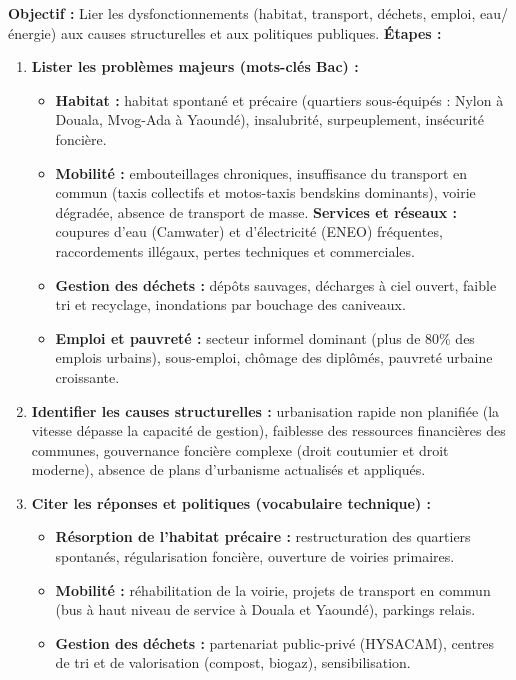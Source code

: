 \documentclass[11pt]{article}
\begin{document}
\begin{methode}
\textbf{Objectif :} Lier les dysfonctionnements (habitat, transport, déchets, emploi, eau/énergie) aux causes structurelles et aux politiques publiques.
\textbf{Étapes :}
\begin{enumerate}
    \item \textbf{Lister les problèmes majeurs (mots-clés Bac) :}
    \begin{itemize}
        \item \textbf{Habitat :} habitat spontané et précaire (quartiers sous-équipés : Nylon à Douala, Mvog-Ada à Yaoundé), insalubrité, surpeuplement, insécurité foncière.
        \item \textbf{Mobilité :} embouteillages chroniques, insuffisance du transport en commun (taxis collectifs et motos-taxis \og bendskins \fg{} dominants), voirie dégradée, absence de transport de masse.
        \textbf{Services et réseaux :} coupures d'eau (Camwater) et d'électricité (ENEO) fréquentes, raccordements illégaux, pertes techniques et commerciales.
        \item \textbf{Gestion des déchets :} dépôts sauvages, décharges à ciel ouvert, faible tri et recyclage, inondations par bouchage des caniveaux.
        \item \textbf{Emploi et pauvreté :} secteur informel dominant (plus de 80\% des emplois urbains), sous-emploi, chômage des diplômés, pauvreté urbaine croissante.
    \end{itemize}
    \item \textbf{Identifier les causes structurelles :} urbanisation rapide non planifiée (la vitesse dépasse la capacité de gestion), faiblesse des ressources financières des communes, gouvernance foncière complexe (droit coutumier et droit moderne), absence de plans d'urbanisme actualisés et appliqués.
    \item \textbf{Citer les réponses et politiques (vocabulaire technique) :}
    \begin{itemize}
        \item \textbf{Résorption de l'habitat précaire :} restructuration des quartiers spontanés, régularisation foncière, ouverture de voiries primaires.
        \item \textbf{Mobilité :} réhabilitation de la voirie, projets de transport en commun (bus à haut niveau de service à Douala et Yaoundé), parkings relais.
        \item \textbf{Gestion des déchets :} partenariat public-privé (HYSACAM), centres de tri et de valorisation (compost, biogaz), sensibilisation.

\end{itemize}
\end{enumerate}
\end{methode}
\end{document}
